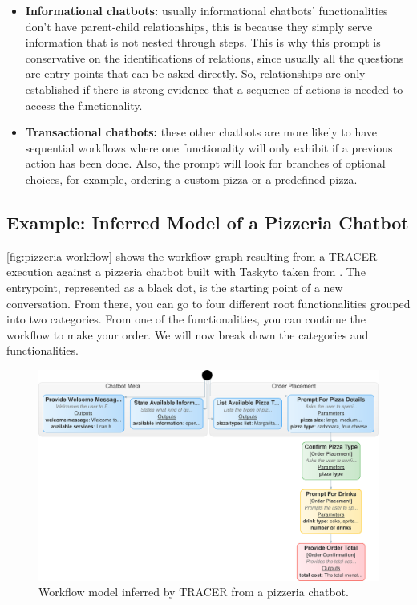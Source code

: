\begin{itemize}
  \item \textbf{Informational chatbots:}
    usually informational chatbots' functionalities
    don't have parent-child relationships,
    this is because they simply serve information that is not nested through steps.
    This is why this prompt is conservative on the identifications of relations,
    since usually all the questions are entry points
    that can be asked directly.
    So, relationships are only established
    if there is strong evidence that
    a sequence of actions is needed to access the functionality.

  \item \textbf{Transactional chatbots:}
    these other chatbots are more likely to have sequential workflows
    where one functionality will only exhibit
    if a previous action has been done.
    Also, the prompt will look for branches of optional choices,
    for example, ordering a custom pizza or a predefined pizza.
\end{itemize}

\subsection{Example: Inferred Model of a Pizzeria Chatbot}

\autoref{fig:pizzeria-workflow}
shows the workflow graph resulting from a \ac{TRACER} execution
against a pizzeria chatbot built with Taskyto taken from
\autocite{sanchezcuadradoAutomatingDevelopmentTaskoriented2024}.
The entrypoint, represented as a black dot,
is the starting point of a new conversation.
From there, you can go to four different root functionalities
grouped into two categories.
From one of the functionalities,
you can continue the workflow to make your order.
We will now break down the categories and functionalities.

\begin{figure}[htpb]
  \centering
  \includegraphics[width=\linewidth]{figures/workflow_graph-crop-back.pdf}
  \caption{
    Workflow model inferred by \ac{TRACER} from a pizzeria chatbot.
  }
  \label{fig:pizzeria-workflow}
\end{figure}

